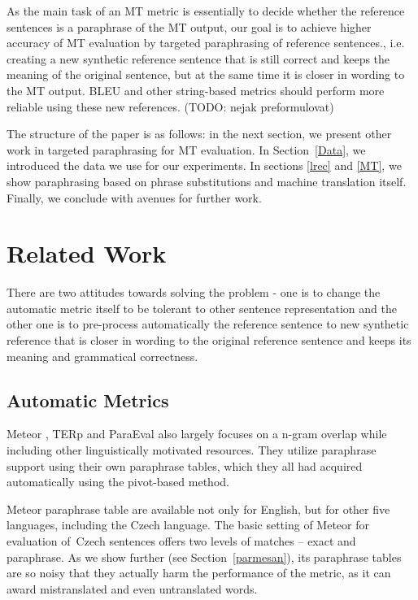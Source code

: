 \documentclass[11pt]{article}
\def\Sref#1{Section~\ref{#1}}
\begin{document}
As the main task of an MT metric is essentially to decide whether the reference
sentences is a paraphrase of the MT output, our goal is to achieve higher 
accuracy of MT evaluation by targeted paraphrasing of reference sentences., i.e. 
creating a new synthetic reference sentence that is still correct and keeps the 
meaning of the original sentence, but at the same time it is closer in wording 
to the MT output. BLEU and other string-based metrics should perform more 
reliable using these new references. (TODO: nejak preformulovat)

The structure of the paper is as follows: in the next section, we present other
work in targeted paraphrasing for MT evaluation. In \Sref{Data}, we introduced
the data we use for our experiments.  In sections \ref{lrec} and \ref{MT}, 
we show paraphrasing based on phrase substitutions and machine translation 
itself. Finally, we conclude with avenues for further work.

\section{Related Work}
There are two attitudes towards solving the problem - one is to change the 
automatic metric itself to be tolerant to other sentence representation and the
other one is to pre-process automatically the reference sentence to new 
synthetic reference that is closer in wording to the original reference 
sentence and keeps its meaning and grammatical correctness.

\subsection{Automatic Metrics}
Meteor \cite{meteor-wmt:2014}, TERp \cite{terp} and ParaEval \cite{paraeval2} 
also largely focuses on a n-gram overlap while including other linguistically 
motivated resources. They utilize paraphrase support using their own paraphrase 
tables, which they all had acquired automatically using the pivot-based method. 
\cite{pivoting} 


Meteor paraphrase table are available not only for English, but for other five 
languages, including the Czech language. The basic setting of Meteor for 
evaluation of~Czech sentences offers two levels of matches -- exact and 
paraphrase. As we show further (see \Sref{parmesan}), its paraphrase tables 
are so noisy that they actually harm the performance of the metric, as it can
award mistranslated and even untranslated words.
\end{document}
